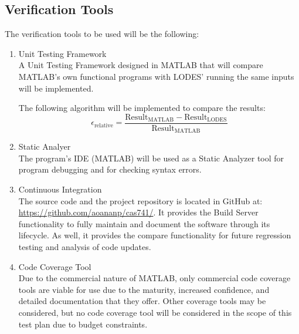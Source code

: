 \documentclass[12pt, titlepage]{article}
\newcommand{\famname}{LODES} %
\newcommand{\famurl}{https://github.com/aoananp/cas741/}
\begin{document}
\subsection{Verification Tools} \label{sec_verificationtools}
The verification tools to be used will be the following:

\begin{enumerate}
\item{Unit Testing Framework\\}
A Unit Testing Framework designed in MATLAB that will compare MATLAB's own functional programs
with
\famname{}' running the same inputs will be implemented.

The following algorithm will be implemented to compare the results:
$$\epsilon_{\text{relative}} = \frac{\text{Result}_\text{MATLAB} - \text{Result}_\text{\famname{}}} {\text{Result}_\text{MATLAB}} $$

\item{Static Analyer\\}
The program's IDE (MATLAB) will be used as a Static Analyzer tool for program debugging and
for checking syntax errors.

\item{Continuous Integration\\}
The source code and the project repository is located in GitHub at: \url{\famurl}.
It provides the Build Server functionality to fully maintain and document the software through its lifecycle.
As well, it provides the compare functionality for future regression testing and analysis of code updates.

\item{Code Coverage Tool\\}
Due to the commercial nature of MATLAB, only commercial code coverage tools are viable for use due to the maturity, increased confidence, and detailed documentation that they offer. Other coverage tools may be considered, but no code coverage tool will be considered in the scope of this test plan due to budget constraints.

\end{enumerate}


		
\end{document}
